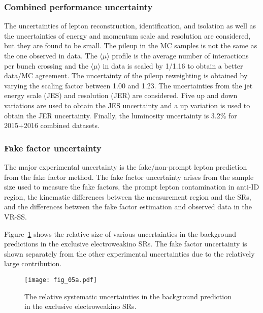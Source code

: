 
\subsubsection{Combined performance uncertainty}
\label{subsubsec:bkg_combined_performance uncertainty}
The uncertainties of lepton reconstruction, identification, and isolation as well as the uncertainties of energy and momentum scale and resolution are considered, but they are found to be small.
The pileup in the MC samples is not the same as the one observed in data.
The $\langle \mu \rangle$ profile is the average number of interactions per bunch crossing and the $\langle \mu \rangle$ in data is scaled by 1/1.16 to obtain a better data/MC agreement.
The uncertainty of the pileup reweighting is obtained by varying the scaling factor between 1.00 and 1.23.
The uncertainties from the jet energy scale (JES) and resolution (JER) are considered.
Five up and down variations are used to obtain the JES uncertainty and a up variation is used to obtain the JER uncertainty.
Finally, the luminosity uncertainty is 3.2\% for 2015+2016 combined datasets.


\subsubsection{Fake factor uncertainty}
\label{subsubsec:bkg_fake_factor_uncertainty}
The major experimental uncertainty is the fake/non-prompt lepton prediction from the fake factor method.
The fake factor uncertainty arises from the sample size used to measure the fake factors, the prompt lepton contamination in anti-ID region, the kinematic differences between the measurement region and the SRs, and the differences between the fake factor estimation and observed data in the VR-SS.

Figure~\ref{fig:bkg_relative_systematic_uncertainties} shows the relative size of various uncertainties in the background predictions in the exclusive electroweakino SRs.
The fake factor uncertainty is shown separately from the other experimental uncertainties due to the relatively large contribution.

\begin{figure}[htbp]
    \begin{center}
        \texttt{[image: fig\_05a.pdf]}
        \caption{The relative systematic uncertainties in the background prediction in the exclusive electroweakino SRs.}
        \label{fig:bkg_relative_systematic_uncertainties}
    \end{center}
\end{figure}
